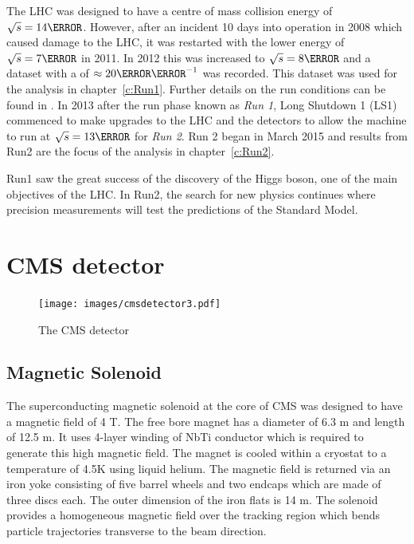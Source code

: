 The LHC was designed to have a centre of mass collision energy of $\sqrt{s} = 14 \TeV$. However, after an incident 10 days into operation in 2008 which caused damage to the LHC, it was restarted with the lower energy of $\sqrt{s} = 7 \TeV$ in 2011. In 2012 this was increased to $\sqrt{s} = 8 \TeV$ and a dataset with a  of $\approx 20 \fbinv$ was recorded. This dataset was used for the analysis in chapter~\ref{c:Run1}. Further details on the run conditions can be found in . In 2013 after the run phase known as \emph{Run 1}, Long Shutdown 1 (LS1) commenced to make upgrades to the LHC and the detectors to allow the machine to run at $\sqrt{s} = 13 \TeV$ for \emph{Run 2}. Run 2 began in March 2015 and results from Run2 are the focus of the analysis in chapter~\ref{c:Run2}.

Run1 saw the great success of the discovery of the Higgs boson, one of the main objectives of the LHC. In Run2, the search for new physics continues where precision measurements will test the predictions of the Standard Model.

\section{CMS detector \label{sec:CMSdet}
}

\begin{figure}[ht!]
\centering
    \texttt{[image: images/cmsdetector3.pdf]}
    \caption{The CMS detector~\cite{1742-6596-513-2-022032}}
    \label{fig:CMSdetector}
\end{figure}

\subsection{Magnetic Solenoid}

The superconducting magnetic solenoid at the core of CMS was designed to have a magnetic field of 4 T. The free bore magnet has a diameter of 6.3 m and length of 12.5 m. It uses 4-layer winding of NbTi conductor which is required to generate this high magnetic field. The magnet is cooled within a cryostat to a temperature of 4.5K using liquid helium. The magnetic field is returned via an iron yoke consisting of five barrel wheels and two endcaps which are made of three discs each. The outer dimension of the iron flats is 14 m.
The solenoid provides a homogeneous magnetic field over the tracking region which bends particle trajectories transverse to the beam direction.

